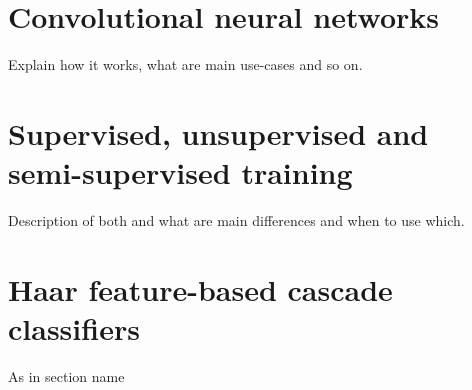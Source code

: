 \section{Convolutional neural networks}
Explain how it works, what are main use-cases and so on.

\section{Supervised, unsupervised and semi-supervised training}
Description of both and what are main differences and when to use which.

\section{Haar feature-based cascade classifiers}
\label{Haar feature-based cascade classifiers}
As in section name
